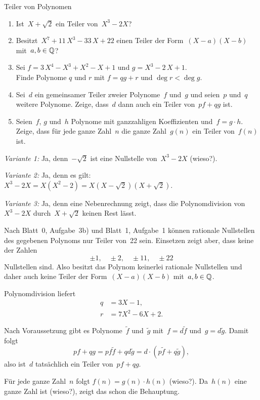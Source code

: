 \documentclass{algblatt}
\begin{document}
\begin{aufgabe}{Teiler von Polynomen}
\begin{enumerate}
\item Ist~$X+\sqrt{2}$ ein Teiler von~$X^3-2X$?
\item Besitzt~$X^7 + 11\,X^3 - 33\,X + 22$ einen Teiler der
Form~$(X-a)(X-b)$ mit~$a,b \in \mathbb{Q}$?
\item Sei $f = 3\,X^4 - X^3 + X^2 - X + 1$ und $g = X^3 - 2\,X + 1$. \\
Finde Polynome $q$ und $r$ mit $f = q g + r$ und
$\deg r < \deg g$.
\item Sei~$d$ ein gemeinsamer Teiler zweier Polynome~$f$ und~$g$ und seien~$p$
und~$q$ weitere Polynome.
Zeige, dass~$d$ dann auch ein Teiler von~$pf + qg$ ist.
\item Seien~$f$, $g$ und~$h$ Polynome mit ganzzahligen Koeffizienten und~$f =
g \cdot h$. Zeige, dass für jede ganze Zahl~$n$ die ganze Zahl~$g(n)$ ein Teiler
von~$f(n)$ ist.
\end{enumerate}
\begin{loesungE}
\item \emph{Variante 1:} Ja, denn~$-\sqrt{2}$ ist eine Nullstelle von~$X^3 -
2X$ (wieso?).

\emph{Variante 2:} Ja, denn es gilt:
$X^3 - 2X = X (X^2 - 2) = X (X - \sqrt{2}) (X + \sqrt{2})$.

\emph{Variante 3:} Ja, denn eine Nebenrechnung zeigt, dass die Polynomdivision
von~$X^3 - 2X$ durch~$X+\sqrt{2}$ keinen Rest lässt.

\item Nach Blatt~0, Aufgabe~3b) und Blatt~1, Aufgabe~1 können
rationale Nullstellen des gegebenen Polynoms nur Teiler von~22 sein. Einsetzen
zeigt aber, dass keine der Zahlen
\[ \pm 1, \quad \pm 2, \quad \pm 11, \quad \pm 22 \]
Nullstellen sind. Also besitzt das Polynom keinerlei rationale Nullstellen und
daher auch keine Teiler der Form~$(X-a)(X-b)$ mit~$a,b \in \mathbb{Q}$.

\item Polynomdivision liefert
\begin{align*}
  q &= 3X - 1, \\
  r &= 7X^2 - 6X + 2.
\end{align*}

\item Nach Voraussetzung gibt es Polynome~$\tilde f$ und~$\tilde g$ mit~$f = d
\tilde f$ und~$g = d \tilde g$. Damit folgt
\[ pf + qg = pf\tilde f + qd\tilde g = d \cdot (p\tilde f + q\tilde g), \]
also ist~$d$ tatsächlich ein Teiler von~$pf+qg$.

\item Für jede ganze Zahl~$n$ folgt $f(n) = g(n) \cdot h(n)$ (wieso?). Da~$h(n)$ eine
ganze Zahl ist (wieso?), zeigt das schon die Behauptung.
\end{loesungE}
\end{aufgabe}
\end{document}
